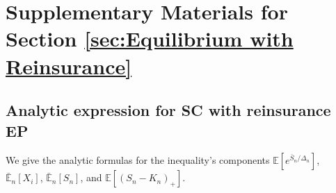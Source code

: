 \documentclass[fleqn,mnsc,nonblindrev]{informs4}
\newcommand{\EE}{\mathbb{E}}
\begin{document}

\section{Supplementary Materials for Section \ref{sec:Equilibrium with Reinsurance}}\label{App:D}

\subsection{Analytic expression for SC with reinsurance EP}\label{subsec:analytic expressions}

We give the analytic formulas for the inequality's components  $\EE[e^{\bar{S}_n/\Delta_n}]$, $\bar{\EE}_n[X_i]$, $\bar{\EE}_n[S_n]$, and $\EE[(S_n-K_n)_+]$.
\end{document}
